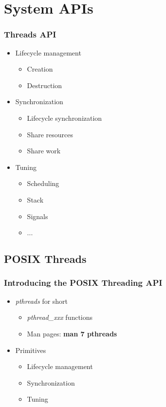 \section{System APIs}



\begin{frame}
  \frametitle{Threads API}

  \begin{itemize}
  \item Lifecycle management
    \begin{itemize}
    \item Creation
    \item Destruction
    \end{itemize}
  \item Synchronization
    \begin{itemize}
    \item Lifecycle synchronization
    \item Share resources
    \item Share work
    \end{itemize}
  \item Tuning
    \begin{itemize}
    \item Scheduling
    \item Stack
    \item Signals
    \item ...
    \end{itemize}
  \end{itemize}
\end{frame}









\subsection{POSIX Threads}
\label{subsec:pthreads}



\begin{frame}
  \frametitle{Introducing the POSIX Threading API}

  \begin{itemize}
  \item \emph{pthreads} for short
    \begin{itemize}
    \item \emph{pthread\_xxx} functions
    \item Man pages: \textbf{man 7 pthreads}
    \end{itemize}
  \item Primitives
    \begin{itemize}
    \item Lifecycle management
    \item Synchronization
    \item Tuning
    \end{itemize}
  \end{itemize}
\end{frame}

